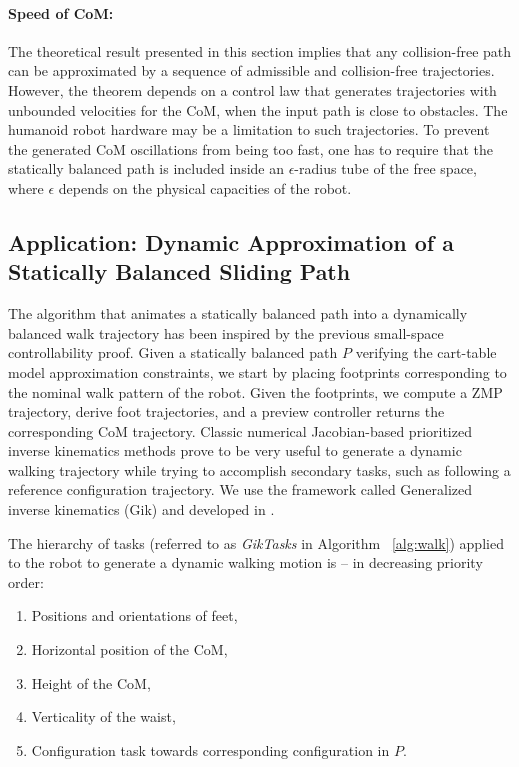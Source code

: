 \paragraph{Speed of CoM:}
The theoretical result presented in this section implies that any
collision-free path can be approximated by a sequence of admissible
and collision-free trajectories. However, the theorem depends on a
control law that generates trajectories with unbounded velocities for
the CoM, when the input path is close to obstacles. The humanoid robot
hardware may be a limitation to such trajectories. To prevent the
generated CoM oscillations from being too fast, one has to require
that the statically balanced path is included inside an
$\epsilon$-radius tube of the free space, where $\epsilon$ depends on
the physical capacities of the robot.

\subsection{Application: Dynamic Approximation of a Statically Balanced Sliding Path}
\label{sec:ssc-application}

The algorithm that animates a statically balanced path into a
dynamically balanced walk trajectory has been inspired by the previous
small-space controllability proof. Given a statically balanced path
$P$ verifying the cart-table model approximation constraints, we start
by placing footprints corresponding to the nominal walk pattern of the
robot. Given the footprints, we compute a ZMP trajectory, derive foot
trajectories, and a preview controller returns the corresponding CoM
trajectory. Classic numerical Jacobian-based prioritized inverse
kinematics methods prove to be very useful to generate a dynamic
walking trajectory while trying to accomplish secondary tasks, such as
following a reference configuration trajectory. We use the framework
called Generalized inverse kinematics (Gik) and developed in
\cite{yoshida2006tds}.

The hierarchy of tasks (referred to as \textit{GikTasks} in Algorithm
~\ref{alg:walk}) applied to the robot to generate a dynamic walking
motion is -- in decreasing priority order:

\begin{enumerate}

\item Positions and orientations of  feet,

\item Horizontal position of the CoM,

\item Height of the CoM,

\item Verticality of the waist,

\item Configuration task towards corresponding
  configuration  in $P$.

\end{enumerate}

